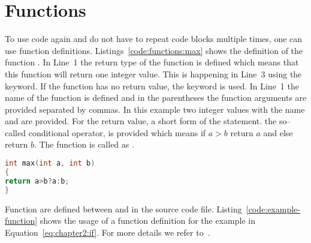 \section{Functions}
To use code again and do not have to repeat code blocks multiple times, one can use function definitions. Listings~\ref{code:functions:max} shows the definition of the function . In Line~1 the return type  of the function is defined which means that this function will return one integer value. This is happening in Line~3 using the  keyword. If the function has no return value, the keyword  is used. In Line~1 the name of the function  is defined and in the parentheses the function arguments are provided separated by commas. In this example two integer values with the name  and  are provided. For the return value, a short form of the  statement. the so--called conditional operator, is provided which means if $a>b$ return $a$ and else return $b$. The function is called as .   \\

\begin{lstlisting}[language=c++,caption={Example for a function definition to compute the maximum of two numbers.\label{code:functions:max}},float,floatplacement=tb]
int max(int a, int b)
{
return a>b?a:b;
}
\end{lstlisting}

Function are defined between  and  in the source code file. Listing~\ref{code:example-function} shows the usage of a function definition for the example in Equation~\ref{eq:chapter2:if}. For more details we refer to~\cite[Chapter~4]{andrew2000accelerated}.




